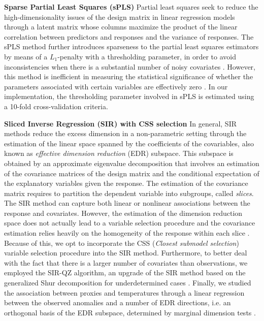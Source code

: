 \documentclass[12pt]{amsart}
\theoremstyle{plain}
\theoremstyle{definition}
\theoremstyle{remark}
\begin{document}
{\bf Sparse Partial Least Squares (sPLS)}
  Partial least squares seek to reduce the high-dimensionality issues of the
  design matrix in  
  linear regression models through a latent matrix whose columns maximize
  the product of the linear correlation between predictors and responses and the
  variance of responses. The sPLS method further introduces sparseness to the partial least squares
  estimators by means of a $L_1$-penalty with a thresholding parameter, in order to avoid inconsistencies when there is a
  substantial number of noisy covariates \citep{Chun2010,Chung2013}. However, this method is inefficient in
  measuring the statistical significance of whether the parameters associated with certain
  variables are effectively zero \citep{OlsonHunt2014}. In our implementation, the
  thresholding parameter involved in sPLS is estimated using a 10-fold cross-validation criteria.    

{\bf Sliced Inverse Regression (SIR) with CSS selection}
  In general, SIR methods \cite{Li1991}  reduce the excess dimension in a non-parametric setting through the
  estimation of the linear space spanned by the coefficients of the covariables,
  also known as \textit{effective dimension reduction} (EDR) subspace. 
  This subspace is obtained by an approximate eigenvalue decomposition that
  involves an estimation of the covariance matrices of the design matrix and
  the conditional expectation of the explanatory variables given the
  response. The
  estimation of the covariance matrix requires to partition the dependent variable into subgroups, called \textit{slices}.
  The SIR method can capture both linear or nonlinear associations between the response and
  covariates. However, the estimation of the dimension
  reduction space does not actually lead to a variable selection procedure and the
  covariance estimation relies heavily on the homogeneity of the response within
  each slice \cite{Wu2010}. Because of this, we opt to incorporate the CSS
  (\textit{Closest submodel selection}) variable 
  selection procedure into the SIR method. Furthermore, to better deal with the fact that there is a larger number of
  covariates than observations, we employed the SIR-QZ algorithm, an upgrade of the SIR method based on the generalized Shur decomposition for underdetermined cases \citep{Coudret2014,Coudret2017}.   
  Finally, we studied the association between proxies and temperatures
  through a linear regression between the observed anomalies and a number of EDR directions, i.e. an orthogonal basis of the EDR subspace, determined by marginal dimension tests \citep{Cook2004}. 
  
\end{document}
